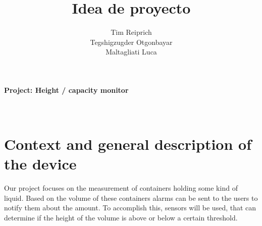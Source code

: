 \documentclass{article}
\title{Idea de proyecto}
\author{Tim Reiprich \\ Tegshigzugder Otgonbayar \\ Maltagliati Luca}
\begin{document}
\maketitle


\pagestyle{plain}

\paragraph*{Project: Height / capacity monitor}\mbox{}\\

\section{Context and general description of the device}

Our project focuses on the measurement of containers holding some kind of
liquid. Based on the volume of these containers alarms can be sent to the users
to notify them about the amount. To accomplish this, sensors will be used, that
can determine if the height of the volume is above or below a certain
threshold. \par
\end{document}

